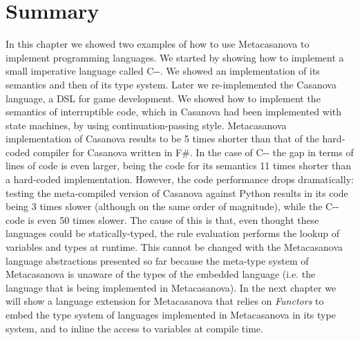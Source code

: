 \section{Summary}
In this chapter we showed two examples of how to use Metacasanova to implement programming languages. We started by showing how to implement a small imperative language called C-{}-. We showed an implementation of its semantics and then of its type system. Later we re-implemented the Casanova language, a DSL for game development. We showed how to implement the semantics of interruptible code, which in Casanova had been implemented with state machines, by using continuation-passing style. Metacasanova implementation of Casanova results to be 5 times shorter than that of the hard-coded compiler for Casanova written in F\#. In the case of C-{}- the gap in terms of lines of code is even larger, being the code for its semantics 11 times shorter than a hard-coded implementation. However, the code performance drops dramatically: testing the meta-compiled version of Casanova against Python results in its code being 3 times slower (although on the same order of magnitude), while the C-{}- code is even 50 times slower. The cause of this is that, even thought these languages could be statically-typed, the rule evaluation performs the lookup of variables and types at runtime. This cannot be changed with the Metacasanova language abstractions presented so far because the meta-type system of Metacasanova is unaware of the types of the embedded language (i.e. the language that is being implemented in Metacasanova). In the next chapter we will show a language extension for Metacasanova that relies on \textit{Functors} to embed the type system of languages implemented in Metacasanova in its type system, and to inline the access to variables at compile time.